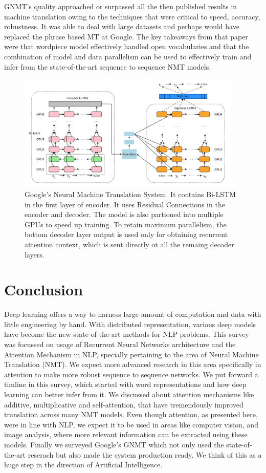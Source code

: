 \documentclass{article}
\begin{document}
	GNMT's quality approached or surpassed all the then published results in machine translation owing to the techniques that were critical to speed, accuracy, robustness. It was able to deal with large datasets and perhaps would have replaced the phrase based MT at Google. The key takeaways from that paper were that wordpiece model effectively handled open vocabularies and that the combination of model and data parallelism can be used to effectively train and infer from the state-of-the-art sequence to sequence NMT models.
	
	\begin{figure}
		\centering
		\includegraphics[width=0.95\textwidth]{fig/googatn.png}
		\caption{Google's Neural Machine Translation System. It contains Bi-LSTM in the first layer of encoder. It uses Residual Connections in the encoder and decoder. The model is also partioned into multiple GPUs to speed up training. To retain maximum parallelism, the bottom decoder layer output is used only for obtaining recurrent attention context, which is sent directly ot all the remaing decoder layers. }
		\label{fig:goognmt}
	\end{figure}

\section{Conclusion}
\label{sec:conclusion}
	
	Deep learning offers a way to harness large amount of computation and data with little engineering by hand.  With distributed representation, various deep models have become the new state-of-the-art methods for NLP problems. This survey was focussed on usage of Recurrent Neural Networks architecture and the Attention Mechanism in NLP, specially pertaining to the area of Neural Machine Translation (NMT). We expect more advanced research in this area specifically in attention to make more robust sequence to sequence networks. We put forward a timline in this survey, which started with word representations and how deep learning can better infer from it. We discussed about attention mechanisms like additive, multiplicative and self-attention, that have tremendously improved translation across many NMT models. Even though attention, as presented here, were in line with NLP, we expect it to be used in areas like computer vision, and image analysis, where more relevant information can be extracted using these models. Finally we surveyed Google's GNMT which not only used the state-of-the-art reserach but also made the system production ready. We think of this as a huge step in the direction of Artificial Intelligence. 
\end{document}
